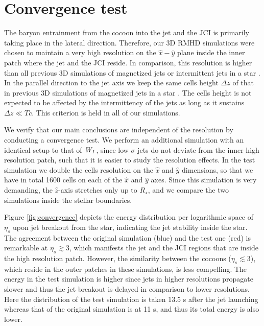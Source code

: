 \documentclass[fleqn,usenatbib]{mnras}
\newcommand{\Wb}{{\it W_{1}}}
\begin{document}
	
	
	
	\appendix
	\section{Convergence test} \label{sec:app}
	
	The baryon entrainment from the cocoon into the jet and the JCI is primarily taking place in the lateral direction. Therefore, our 3D RMHD simulations were chosen to maintain a very high resolution on the $ \hat{x}-\hat{y} $ plane inside the inner patch where the jet and the JCI reside. In comparison, this resolution is higher than all previous 3D simulations of magnetized jets or intermittent jets in a star \citep{LopezCamara2016,Gottlieb2020b,Gottlieb2020a}. In the parallel direction to the jet axis we keep the same cells height $ \Delta z $ of that in previous 3D simulations of magnetized jets in a star \citep{Gottlieb2020b}. The cells height is not expected to be affected by the intermittency of the jets as long as it sustains $ \Delta z \ll Tc $. This criterion is held in all of our simulations.
	
	We verify that our main conclusions are independent of the resolution by conducting a convergence test. We perform an additional simulation with an identical setup to that of $ \Wb $, since low $ \sigma $ jets do not deviate from the inner high resolution patch, such that it is easier to study the resolution effects.
	In the test simulation we double the cells resolution on the $ \hat{x} $ and $ \hat{y} $ dimensions, so that we have in total 1600 cells on each of the $ \hat{x} $ and $ \hat{y} $ axes. Since this simulation is very demanding, the $ \hat{z} $-axis stretches only up to $ R_\star $, and we compare the two simulations inside the stellar boundaries. 
	
	Figure \ref{fig:convergence} depicts the energy distribution per logarithmic space of $ \eta_s $ upon jet breakout from the star, indicating the jet stability inside the star. The agreement between the original simulation (blue) and the test one (red) is remarkable at $ \eta_s \gtrsim 3 $, which manifests the jet and the JCI regions \citep{Gottlieb2021} that are inside the high resolution patch. However, the similarity between the cocoons ($ \eta_s \lesssim 3 $), which reside in the outer patches in these simulations, is less compelling. The energy in the test simulation is higher since jets in higher resolutions propagate slower and thus the jet breakout is delayed in comparison to lower resolutions. Here the distribution of the test simulation is taken 13.5 s after the jet launching whereas that of the original simulation is at 11 s, and thus its total energy is also lower.
	
\end{document}
